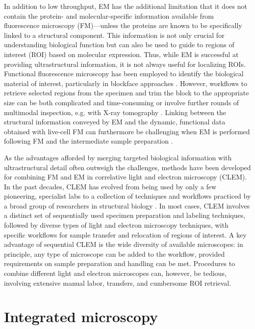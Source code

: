 In addition to low throughput, EM has the additional limitation that it does not contain the protein- and molecular-specific information available from fluorescence microscopy (FM)---unless the proteins are known to be specifically linked to a structural component. This information is not only crucial for understanding biological function but can also be used to guide to regions of interest (ROI) based on molecular expression. Thus, while EM is successful at providing ultrastructural information, it is not always useful for localizing ROIs. Functional fluorescence microscopy has been employed to identify the biological material of interest, particularly in blockface approaches \cite{karreman2016fast}. However, workflows to retrieve selected regions from the specimen and trim the block to the appropriate size can be both complicated and time-consuming or involve further rounds of multimodal inspection, e.g. with X-ray tomography \cite{karreman2016intravital}. Linking between the structural information conveyed by EM and the dynamic, functional data obtained with live-cell FM can furthermore be challenging when EM is performed following FM and the intermediate sample preparation \cite{de2015correlated}.

As the advantages afforded by merging targeted biological information with ultrastructural detail often outweigh the challenges, methods have been developed for combining FM and EM in correlative light and electron microscopy (CLEM). In the past decades, CLEM has evolved from being used by only a few pioneering, specialist labs to a collection of techniques and workflows practiced by a broad group of researchers in structural biology \cite{de2015correlated, ando20182018}. In most cases, CLEM involves a distinct set of sequentially used specimen preparation and labeling techniques, followed by diverse types of light and electron microscopy techniques, with specific workflows for sample transfer and relocation of regions of interest. A key advantage of sequential CLEM is the wide diversity of available microscopes: in principle, any type of microscope can be added to the workflow, provided requirements on sample preparation and handling can be met. Procedures to combine different light and electron microscopes can, however, be tedious, involving extensive manual labor, transfers, and cumbersome ROI retrieval.


\section{Integrated microscopy}
\label{sec:1_integrated}


